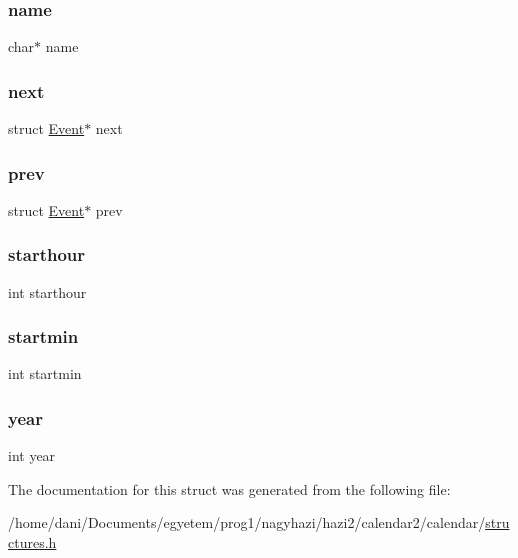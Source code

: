 \mbox{\label{struct_event_a5ac083a645d964373f022d03df4849c8}} 
\subsubsection{\texorpdfstring{name}{name}}
{\footnotesize\ttfamily char$\ast$ name}

\mbox{\label{struct_event_a306f86f79bc8a24df2ff2989f10ea5b8}} 
\subsubsection{\texorpdfstring{next}{next}}
{\footnotesize\ttfamily struct \hyperlink{struct_event}{Event}$\ast$ next}

\mbox{\label{struct_event_a587efee11d7ca5779c56b343342c65f9}} 
\subsubsection{\texorpdfstring{prev}{prev}}
{\footnotesize\ttfamily struct \hyperlink{struct_event}{Event}$\ast$ prev}

\mbox{\label{struct_event_ad40616cbc61c79a6caf6c8c2464bab8d}} 
\subsubsection{\texorpdfstring{starthour}{starthour}}
{\footnotesize\ttfamily int starthour}

\mbox{\label{struct_event_a6a7bf86ae11349bf260da9abce25452a}} 
\subsubsection{\texorpdfstring{startmin}{startmin}}
{\footnotesize\ttfamily int startmin}

\mbox{\label{struct_event_abeac221e38b7b9ce7df8722c842bf671}} 
\subsubsection{\texorpdfstring{year}{year}}
{\footnotesize\ttfamily int year}



The documentation for this struct was generated from the following file\+:\begin{DoxyCompactItemize}
\item 
/home/dani/\+Documents/egyetem/prog1/nagyhazi/hazi2/calendar2/calendar/\hyperlink{structures_8h}{structures.\+h}\end{DoxyCompactItemize}
